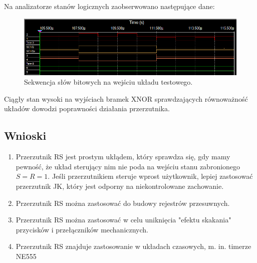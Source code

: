\documentclass[12pt,a4paper,table]{article}
\begin{document}
    Na analizatorze stanów logicznych zaobserwowano następujące dane:

    \begin{figure}[h]
        \centering
        \includegraphics[width=0.8\linewidth]{images/rs_plot.PNG}
        \caption{Sekwencja słów bitowych na wejściu układu testowego.}
        \label{fig:rs_plot}
    \end{figure}

    Ciągły stan wysoki na wyjściach bramek XNOR sprawdzających równoważność układów dowodzi poprawności działania
    przerzutnika.

    \subsection{Wnioski}

    \begin{enumerate}
        \item Przerzutnik RS jest prostym ukłądem, który sprawdza się,
            gdy mamy pewność, że układ sterujący nim nie poda na wejściu stanu zabronionego $S = R = 1$. Jeśli przerzutnikiem
            steruje wprost użytkownik, lepiej zastosować przerzutnik JK, który jest odporny na niekontrolowane zachowanie.

        \item Przerzutnik RS można zastosować do budowy rejestrów przesuwnych.
        
        \item Przerzutnik RS można zastosować w celu uniknięcia "efektu skakania" przycisków i przełączników mechanicznych.
    
        \item Przerzutnik RS znajduje zastosowanie w układach czasowych, m. in. timerze NE555
    \end{enumerate}
\end{document}
